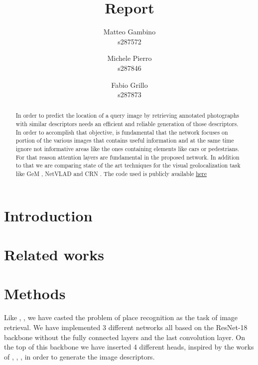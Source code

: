\documentclass[10pt,twocolumn,letterpaper]{article}
\begin{document}
\title{Report}

\author{Matteo Gambino\\
s287572
\and
Michele Pierro\\
s287846
\and
Fabio Grillo\\
s287873
}
\maketitle

\begin{abstract}
   In order to predict the location of a query image by retrieving annotated photographs with 
   similar descriptors needs an efficient and reliable generation of those descriptors. 
   In order to accomplish that objective, is fundamental that the network focuses on portion
   of the various images that contains useful information and at the same time ignore not 
   informative areas like the ones containing elements like cars or pedestrians. For that 
   reason attention layers are fundamental in the proposed network. In addition to that we 
   are comparing state of the art techniques for the visual geolocalization task like GeM \cite{GEM}, 
   NetVLAD \cite{NETVLAD} and CRN \cite{CRN}. The code used is publicly available 
   \href{https://github.com/matteo6198/project_visual_geolocalization}{here}
\end{abstract}

\section{Introduction}

\section{Related works}

\section{Methods}
Like \cite{GEM}, \cite{NETVLAD}, \cite{CRN} we have casted the problem of place recognition as the task of image
retrieval. We have implemented 3 different networks all based on the ResNet-18 \cite{resnet} backbone
without the fully connected layers and the last convolution layer. On the top of this backbone we 
have inserted 4 different heads, inspired by the works of \cite{GEM}, \cite{NETVLAD}, \cite{CRN}, in order
to generate the image descriptors. 
\end{document}
